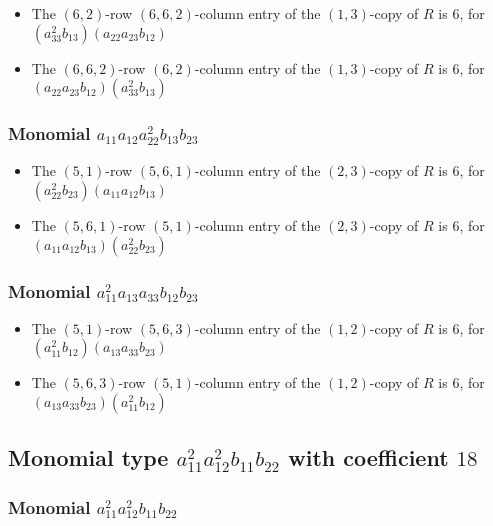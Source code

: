 \documentclass{article}
\begin{document}
\begin{itemize}
\item The $(6, 2)$-row $(6, 6, 2)$-column entry of the $ \left(1, 3\right) $-copy of $R$ is $ 6 $, for $( a_{33}^{2} b_{13} )( a_{22} a_{23} b_{12} )$ 
\item The $(6, 6, 2)$-row $(6, 2)$-column entry of the $ \left(1, 3\right) $-copy of $R$ is $ 6 $, for $( a_{22} a_{23} b_{12} )( a_{33}^{2} b_{13} )$ 
\end{itemize}
\subsubsection{Monomial $ a_{11} a_{12} a_{22}^{2} b_{13} b_{23} $}

\begin{itemize}
\item The $(5, 1)$-row $(5, 6, 1)$-column entry of the $ \left(2, 3\right) $-copy of $R$ is $ 6 $, for $( a_{22}^{2} b_{23} )( a_{11} a_{12} b_{13} )$ 
\item The $(5, 6, 1)$-row $(5, 1)$-column entry of the $ \left(2, 3\right) $-copy of $R$ is $ 6 $, for $( a_{11} a_{12} b_{13} )( a_{22}^{2} b_{23} )$ 
\end{itemize}
\subsubsection{Monomial $ a_{11}^{2} a_{13} a_{33} b_{12} b_{23} $}

\begin{itemize}
\item The $(5, 1)$-row $(5, 6, 3)$-column entry of the $ \left(1, 2\right) $-copy of $R$ is $ 6 $, for $( a_{11}^{2} b_{12} )( a_{13} a_{33} b_{23} )$ 
\item The $(5, 6, 3)$-row $(5, 1)$-column entry of the $ \left(1, 2\right) $-copy of $R$ is $ 6 $, for $( a_{13} a_{33} b_{23} )( a_{11}^{2} b_{12} )$ 
\end{itemize}
\subsection{Monomial type $ a_{11}^{2} a_{12}^{2} b_{11} b_{22} $ with coefficient $ 18 $}

\subsubsection{Monomial $ a_{11}^{2} a_{12}^{2} b_{11} b_{22} $}
\end{document}
